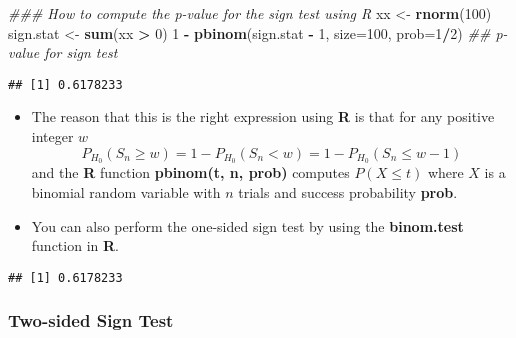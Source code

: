 \documentclass[]{book}
\newenvironment{Shaded}{\begin{snugshade}}{\end{snugshade}}
\newcommand{\CommentTok}[1]{\textcolor[rgb]{0.56,0.35,0.01}{\textit{#1}}}
\newcommand{\DataTypeTok}[1]{\textcolor[rgb]{0.13,0.29,0.53}{#1}}
\newcommand{\DecValTok}[1]{\textcolor[rgb]{0.00,0.00,0.81}{#1}}
\newcommand{\FloatTok}[1]{\textcolor[rgb]{0.00,0.00,0.81}{#1}}
\newcommand{\KeywordTok}[1]{\textcolor[rgb]{0.13,0.29,0.53}{\textbf{#1}}}
\newcommand{\NormalTok}[1]{#1}
\newcommand{\OperatorTok}[1]{\textcolor[rgb]{0.81,0.36,0.00}{\textbf{#1}}}
\newcommand{\StringTok}[1]{\textcolor[rgb]{0.31,0.60,0.02}{#1}}
\begin{document}
\begin{Shaded}
\begin{Highlighting}[]
\CommentTok{### How to compute the p-value for the sign test using R}
\NormalTok{xx <-}\StringTok{ }\KeywordTok{rnorm}\NormalTok{(}\DecValTok{100}\NormalTok{)}
\NormalTok{sign.stat <-}\StringTok{ }\KeywordTok{sum}\NormalTok{(xx }\OperatorTok{>}\StringTok{ }\DecValTok{0}\NormalTok{)}
\DecValTok{1} \OperatorTok{-}\StringTok{ }\KeywordTok{pbinom}\NormalTok{(sign.stat }\OperatorTok{-}\StringTok{ }\DecValTok{1}\NormalTok{, }\DataTypeTok{size=}\DecValTok{100}\NormalTok{, }\DataTypeTok{prob=}\DecValTok{1}\OperatorTok{/}\DecValTok{2}\NormalTok{) }\CommentTok{## p-value for sign test}
\end{Highlighting}
\end{Shaded}

\begin{verbatim}
## [1] 0.6178233
\end{verbatim}

\begin{itemize}
\item
  The reason that this is the right expression using \textbf{R} is that for any positive integer \(w\)
  \begin{equation}
  P_{H_{0}}(S_{n} \geq w) = 1 - P_{H_{0}}(S_{n} < w) = 1 - P_{H_{0}}(S_{n} \leq w - 1)
  \end{equation}
  and the \textbf{R} function \textbf{pbinom(t, n, prob)} computes \(P(X \leq t)\) where \(X\) is
  a binomial random variable with \(n\) trials and success probability \textbf{prob}.
\item
  You can also perform the one-sided sign test by using the \textbf{binom.test} function in \textbf{R}.
\end{itemize}

\begin{Shaded}
\end{Shaded}

\begin{verbatim}
## [1] 0.6178233
\end{verbatim}

\hypertarget{two-sided-sign-test}{%
\subsubsection{Two-sided Sign Test}\label{two-sided-sign-test}}
\end{document}
